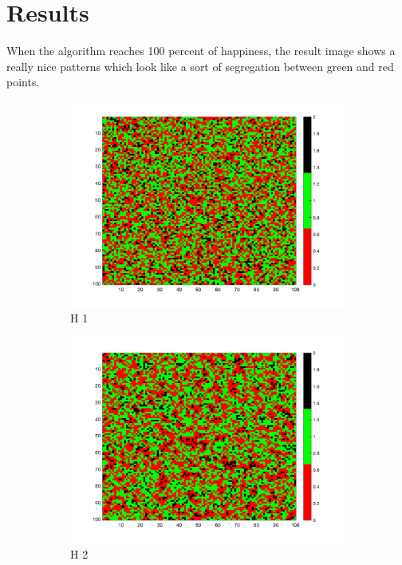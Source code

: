 \documentclass[unicode,11pt,a4paper,oneside,numbers=endperiod,openany]{scrartcl}
\begin{document}
\section*{Results}
When the algorithm reaches 100 percent of happiness, the result image shows a really nice patterns which look like a sort of segregation between green and red points. 
\begin{figure}[H]
    \centering
    \begin{subfigure}[b]{0.3\textwidth}
        
      \includegraphics[width=\textwidth]{results/iterations_5_H_1_random_1.png}
      \caption{H 1}
      \label{fig:image1}
    \end{subfigure}
    \begin{subfigure}[b]{0.3\textwidth}
        \includegraphics[width=\textwidth]{results/iterations_16_H_2_random_1.png}
        \caption{H 2}
        \label{fig:image2}
      \end{subfigure}
      \begin{subfigure}[b]{0.3\textwidth}
        

\end{subfigure}
\end{figure}
\end{document}
